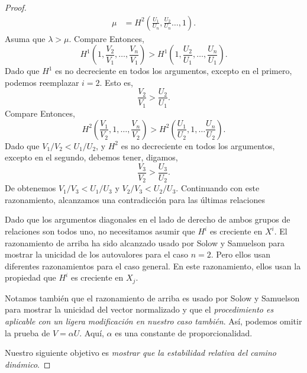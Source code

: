 \begin{proof}
\begin{align}
\mu&=H^{2}\left(\frac{U_{1}}{U_{n}},\frac{U_{2}}{U_{n}}\ldots,1\right).
\end{align}
Asuma que $\lambda>\mu$. Compare %
Entonces, \[ H^{1}\left(1,\frac{V_{2}}{V_{1}},\ldots,\frac{V_{n}}{V_{1}}\right)>H^{1}\left(1,\frac{U_{2}}{U_{1}},\ldots,\frac{U_{n}}{U_{1}}\right). \] Dado que $H^{1}$ es no decreciente en todos los argumentos, excepto en el primero, podemos reemplazar $i=2$. Esto es,
\begin{equation}
\frac{V_{2}}{V_{1}}>\frac{U_{2}}{U_{1}}.
\end{equation}
Compare %
Entonces, \[ H^{2}\left(\frac{V_{1}}{V_{2}},1,\ldots,\frac{V_{n}}{V_{2}}\right)>H^{2}\left(\frac{U_{1}}{U_{2}},1,\ldots\frac{U_{n}}{U_{2}}\right). \] Dado que $V_{1}/V_{2}<U_{1}/U_{2}$, y $H^{2}$ es no decreciente en todos los argumentos, excepto en el segundo, debemos tener, digamos,
\begin{equation}
\frac{V_{3}}{V_{2}}>\frac{U_{3}}{U_{2}}.
\end{equation}
De %
obtenemos $V_{1}/V_{3}<U_{1}/U_{3}$ y $V_{2}/V_{3}<U_{2}/U_{3}$. Continuando con este razonamiento, alcanzamos una contradicción para las últimas relaciones %

Dado que los argumentos diagonales en el lado de derecho de ambos grupos de relaciones son todos uno, no necesitamos asumir que $H^{i}$ es creciente en $X^{i}$. El razonamiento de arriba ha sido alcanzado usado por Solow y Samuelson para mostrar la unicidad de los autovalores para el caso $n=2$. Pero ellos usan diferentes razonamientos para el caso general. En este razonamiento, ellos usan la propiedad que $H^{i}$ es creciente en $X_{j}$.

Notamos también que el razonamiento de arriba es usado por Solow y Samuelson para mostrar la unicidad del vector normalizado y que el \emph{procedimiento es aplicable con un ligera modificación en nuestro caso también}. Así, podemos omitir la prueba de $V=\alpha U$. Aquí, $\alpha$ es una constante de proporcionalidad.

Nuestro siguiente objetivo es \emph{mostrar que la estabilidad relativa del camino dinámico}.


\end{proof}
